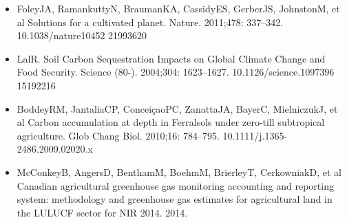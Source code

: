 \documentclass[11pt,a4paper]{article}
\begin{document}
\begin{itemize}
\item FoleyJA, RamankuttyN, BraumanKA, CassidyES, GerberJS, JohnstonM, et al Solutions for a cultivated planet. Nature. 2011;478: 337–342. 10.1038/nature10452 21993620
\item LalR. Soil Carbon Sequestration Impacts on Global Climate Change and Food Security. Science (80-). 2004;304: 1623–1627. 10.1126/science.1097396 15192216
\item BoddeyRM, JantaliaCP, ConceiçaoPC, ZanattaJA, BayerC, MielniczukJ, et al Carbon accumulation at depth in Ferralsols under zero-till subtropical agriculture. Glob Chang Biol. 2010;16: 784–795. 10.1111/j.1365-2486.2009.02020.x
\item McConkeyB, AngersD, BenthamM, BoehmM, BrierleyT, CerkowniakD, et al Canadian agricultural greenhouse gas monitoring accounting and reporting system: methodology and greenhouse gas estimates for agricultural land in the LULUCF sector for NIR 2014. 2014.
\end{itemize}
\end{document}
